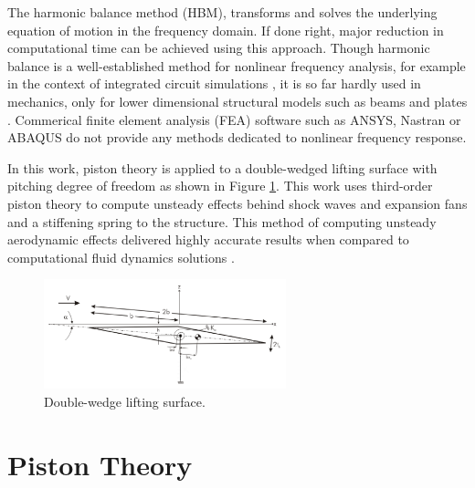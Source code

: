 \documentclass[12pt, a4paper]{extarticle}
\begin{document}
The harmonic balance method (HBM), transforms and solves the underlying equation of motion in the frequency domain. If done right, major reduction in computational time can be achieved using this approach. Though harmonic balance is a well-established method for nonlinear frequency analysis, for example in the context of integrated circuit simulations \cite{gilmore1991nonlinear}, it is so far hardly used in mechanics, only for lower dimensional structural models such as beams and plates \cite{ribeiro2004non}. Commerical finite element analysis (FEA) software such as ANSYS, Nastran or ABAQUS do not provide any methods dedicated to nonlinear frequency response. %

In this work, piston theory is applied to a double-wedged lifting surface with pitching degree of freedom as shown in Figure \ref{fig:doubleWedgedAirfoil}. This work uses third-order piston theory to compute unsteady effects behind shock waves and expansion fans and a stiffening spring to the structure. This method of computing unsteady aerodynamic effects delivered highly accurate results when compared to computational fluid dynamics solutions \cite{mcnamara2011aeroelastic}.

\begin{figure}[h]
	\centering
	\includegraphics[width=7.00cm]{figure/doubleWedgeAirfoil.png}
	\caption{Double-wedge lifting surface.}
	\label{fig:doubleWedgedAirfoil}
\end{figure}
\section{Piston Theory}



\end{document}
